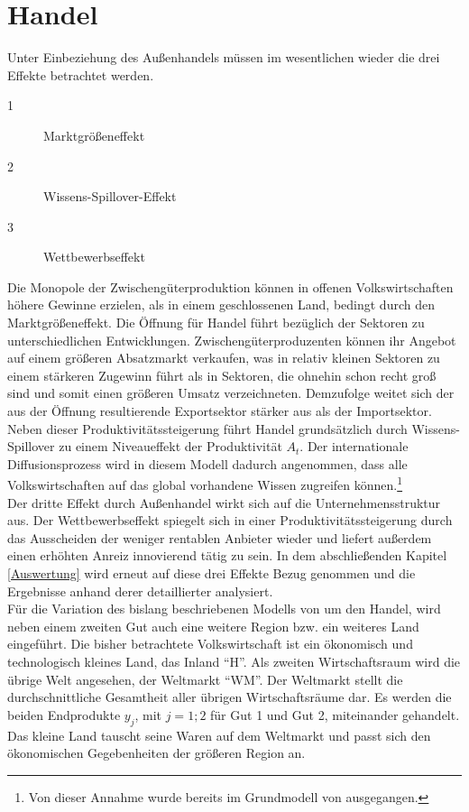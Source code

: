 \section{Handel}\label{sec:Handel}
Unter Einbeziehung des Au{\ss}enhandels müssen im wesentlichen wieder die drei Effekte betrachtet werden.

	\begin{description}
		\item [1] Marktgrö{\ss}eneffekt 
		\item [2] Wissens-Spillover-Effekt
		\item [3] Wettbewerbseffekt
	\end{description}
		
Die Monopole der Zwischengüterproduktion können in offenen Volkswirtschaften höhere Gewinne erzielen, als in einem geschlossenen Land, bedingt durch den Marktgrö{\ss}eneffekt. Die Öffnung für Handel führt bezüglich der Sektoren zu unterschiedlichen Entwicklungen. Zwischengüterproduzenten können ihr Angebot auf einem grö{\ss}eren Absatzmarkt verkaufen, was in relativ kleinen Sektoren zu einem stärkeren Zugewinn führt als in Sektoren, die ohnehin schon recht gro{\ss} sind und somit einen grö{\ss}eren Umsatz verzeichneten. Demzufolge weitet sich der aus der Öffnung resultierende Exportsektor stärker aus als der Importsektor.\\
Neben dieser Produktivitätssteigerung führt Handel grundsätzlich durch Wissens-Spillover zu einem Niveaueffekt der Produktivität $A_t$. Der internationale Diffusionsprozess wird in diesem Modell dadurch angenommen, dass alle Volkswirtschaften auf das global vorhandene Wissen zugreifen können.\footnote{Von dieser Annahme wurde bereits im Grundmodell von \citet{Acemoglu.2006} ausgegangen.}\\
Der dritte Effekt durch Au{\ss}enhandel wirkt sich auf die Unternehmensstruktur aus. Der Wettbewerbseffekt spiegelt sich in einer Produktivitätssteigerung durch das Ausscheiden der weniger rentablen Anbieter wieder und liefert au{\ss}erdem einen erhöhten Anreiz innovierend tätig zu sein. In dem abschlie{\ss}enden Kapitel \ref{Auswertung} wird erneut auf diese drei Effekte Bezug genommen und die Ergebnisse anhand derer detaillierter analysiert.\\
Für die Variation des bislang beschriebenen Modells von \citet{Acemoglu.2006} um den Handel, wird neben einem zweiten Gut auch eine weitere Region bzw. ein weiteres Land eingeführt. Die bisher betrachtete Volkswirtschaft ist ein ökonomisch und technologisch kleines Land, das Inland "`H"'. Als zweiten Wirtschaftsraum wird die übrige Welt angesehen, der Weltmarkt "`WM"'. Der Weltmarkt stellt die durchschnittliche Gesamtheit aller übrigen Wirtschaftsräume dar. Es werden die beiden Endprodukte $y_j$, mit $j=1;2$ für Gut 1 und Gut 2, miteinander gehandelt. Das kleine Land tauscht seine Waren auf dem Weltmarkt und passt sich den ökonomischen Gegebenheiten der grö{\ss}eren Region an. \\
